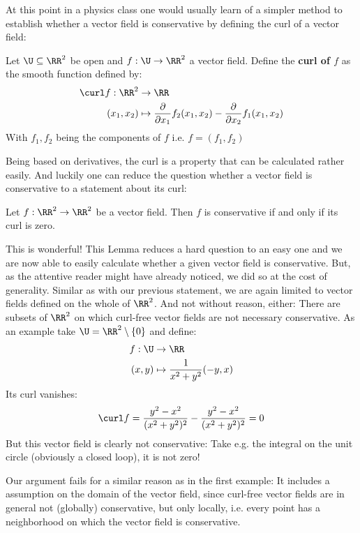 At this point in a physics class one would usually learn of a simpler method to establish whether a vector field is
conservative by defining the curl of a vector field:
\begin{definition}
	Let $\U \subseteq \RR^2$ be open and $f: \U \to \RR^2$ a vector field. Define the \textbf{curl of $f$} as
	the smooth function defined by:
	\begin{align*}
		\curl f: \RR^2 &\to \RR \\
		 (x_1, x_2)
			&\mapsto \frac{\partial}{\partial x_1} f_2(x_1, x_2) - \frac{\partial}{\partial x_2} f_1(x_1, x_2)
	\end{align*}
	With $f_1, f_2$ being the components of $f$ i.e. $f = (f_1, f_2)$
\end{definition}
Being based on derivatives, the curl is a property that can be calculated rather easily. And luckily one
can reduce the question whether a vector field is conservative to a statement about its curl:
\begin{lemma}
Let $f: \RR^2 \to \RR^2$ be a vector field. Then $f$ is conservative if and only if its curl is zero.
\end{lemma}

This is wonderful! This Lemma reduces a hard question to an easy one and we are now able to easily calculate whether
a given vector field is conservative. But, as the attentive reader might have already noticed, we did so at the cost of generality.
Similar as with our previous statement, we are again limited to vector fields defined on the whole of $\RR^2$.
And not without reason, either: There are subsets of $\RR^2$ on which curl-free vector fields are not necessary conservative.
As an example take $\U = \RR^2 \setminus \{0\}$ and define:
\begin{align*}
	f: \U &\to \RR \\
		(x, y) &\mapsto \frac{1}{x^2 + y^2}(-y, x)
\end{align*}
Its curl vanishes:
\begin{align*}
	\curl f = \frac{y^2 - x^2}{(x^2 + y^2)^2} - \frac{y^2 - x^2}{(x^2 + y^2)^2} = 0
\end{align*}
But this vector field is clearly not conservative: Take e.g. the integral on the unit circle (obviously a closed
loop), it is not zero!

Our argument fails for a similar reason as in the first example: It includes a assumption on the domain of
the vector field, since curl-free vector fields are in general not (globally) conservative, but only
locally, i.e. every point has a neighborhood on which the vector field is conservative.

